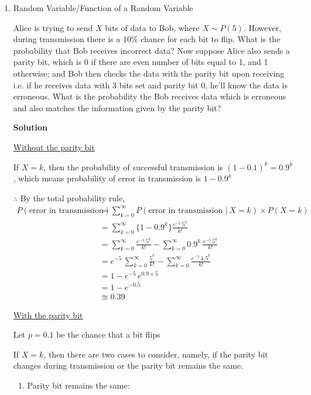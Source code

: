 \documentclass[12pt, oneside]{article}
\begin{document}
\begin{enumerate}
\item {
    Random Variable/Function of a Random Variable

    Alice is trying to send \(X\) bits of data to Bob, where \(X \sim P(5)\). However, during
    transmission there is a \(10\%\) chance for each bit to flip. What is the probability
    that Bob receives incorrect data? Now suppose Alice also sends a parity bit, which is
    0 if there are even number of bits equal to 1, and 1 otherwise; and Bob then checks the
    data with the parity bit upon receiving i.e. if he receives data with 3 bits set and
    parity bit 0, he'll know the data is erroneous. What is the probability the Bob receives
    data which is erroneous and also matches the information given by the parity bit?

    \textbf{Solution}

    \underline{Without the parity bit}

    If \(X = k\), then the probability of successful transmission is \((1 - 0.1)^k = 0.9 ^ k\),
    which means probability of error in transmission is \(1 - 0.9^k\)

    \(\therefore\) By the total probability rule,
    \begin{align*}
        P(\text{error in transmission}) &= \sum_{k = 0}^{\infty} 
                        P(\text{error in transmission } |\,X = k) \times P(X = k) \\
            &= \sum_{k = 0}^{\infty} \{1 - 0.9^k\} \frac{e^{-5}\,5^k}{k!} \\
            &= \sum_{k = 0}^{\infty} \frac{e^{-5}\,5^k}{k!} - \sum_{k = 0}^{\infty} 0.9^k\,\frac{e^{-5}\,5^k}{k!} \\
            &= e^{-5}\,\sum_{k = 0}^{\infty} \frac{5^k}{k!} - \sum_{k = 0}^{\infty} \frac{e^{-5}\,4.5^k}{k!} \\
            &= 1 - e^{-5}\,e^{0.9 \times 5}  \tag*{(Using Taylor series of \(e^x\))} \\
            &= 1 - e^{-0.5} \\
            &\approxeq 0.39
    \end{align*}

    \underline{With the parity bit}

    Let \(p = 0.1\) be the chance that a bit flips

    If \(X = k\), then there are two cases to consider, namely, if the parity bit changes
    during transmission or the parity bit remains the same.

    \begin{enumerate}
        \item {
            Parity bit remains the same:

}
\end{enumerate}}
\end{enumerate}
\end{document}
